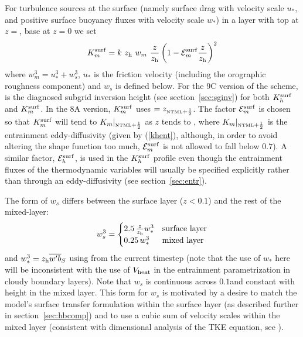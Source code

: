 \documentclass{UMDP_article}
\begin{document}
For turbulence sources at the surface (namely surface drag with
velocity scale $u_*$, and positive surface buoyancy fluxes with
velocity scale $w_*$) in a layer with top at $z=$\zh, base at $z=0$ we
set
\begin{equation}
  \kmsurf = k \ \zhe \ w_m \ \frac{z}{\zhe}
            \left( 1 - {\cal E}_m^{\rm surf} \frac{z}{\zhe} \right)^2
  \label{kmsurf}
\end{equation}
where $w_m^3 = u_*^3 + w_s^3$, $u_*$ is the friction velocity
(including the orographic roughness component) and $w_s$ is defined
below.  For the 9C version of the scheme, \zh is the
diagnosed subgrid inversion height (see section~\ref{sec:sginv}) for
both $K_h^{\rm surf}$ and $K_m^{\rm surf}$.  In the 8A version, $K_m^{\rm surf}$ uses
\zh$=z_{\mbox{\tiny \rm NTML}+\frac{1}{2}}$.  The factor ${\cal E}_m^{\rm surf}$ is
chosen so that $K_m^{\rm surf}$ will tend to $ K_m|_{\mbox{\tiny \rm NTML}+\frac{1}{2}}$ as
$z$ tends to \zh, where $K_m|_{\mbox{\tiny \rm NTML}+\frac{1}{2}}$ is the entrainment
eddy-diffusivity (given by (\ref{khent}), although, in order to avoid
altering the shape function too much, ${\cal E}_m^{\rm surf}$ is not
allowed to fall below $0.7$).  A similar factor, ${\cal E}_h^{\rm
  surf}$, is used in the $K_h^{\rm surf}$ profile even though the entrainment
fluxes of the thermodynamic variables will usually be specified
explicitly rather than through an eddy-diffusivity (see
section~\ref{sec:entr}).

The form of $w_s$ differs between the surface layer ($ z < 0.1 $\zh)
and the rest of the mixed-layer:
\begin{equation}
  w_s^3 = 
  \begin{cases}
    2.5 \, \frac{z}{z_{\rm h}} w_*^3   & {\rm surface\ layer} \\
    0.25 \, w_*^3                 & {\rm mixed\ layer}   \\
  \end{cases}
  \label{ws_defn}
\end{equation}
and $w_*^3=z_{\rm h} \overline{w'b}_S$ using \zh from the current timestep (note that
the use of $w_*$ here will be inconsistent with the use of $V_{\rm heat}$
in the entrainment parametrization in cloudy boundary layers).  Note
that $w_s$ is continuous across $0.1$\zh and constant with height in
the mixed layer.  This form for $w_s$ is motivated by a desire to
match the model's surface transfer formulation within the surface
layer (as described further in section~\ref{sec:hbcomp}) and to use a
cubic sum of velocity scales within the mixed layer (consistent with
dimensional analysis of the TKE equation, see
\cite{holtslag93:_local_versus_nonloc_bound_layer}).
\end{document}
